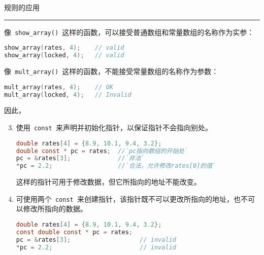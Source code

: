 \begin{frame}[fragile]
规则的应用
\rule{\textwidth}{0.2mm} 
像\lstinline| show_array() |这样的函数，可以接受普通数组和常量数组的名称作为实参：
\begin{lstlisting}[language=c,backgroundcolor=\color{red!20}]
show_array(rates, 4);    // valid
show_array(locked, 4);   // valid
\end{lstlisting} \vspace{0.1in}

像\lstinline| mult_array() |这样的函数，不能接受常量数组的名称作为参数：
\begin{lstlisting}[language=c,backgroundcolor=\color{red!20}]
mult_array(rates, 4);    // OK
mult_array(locked, 4);   // Invalid
\end{lstlisting}
\vspace{0.1in}

因此，
\end{frame}

\begin{frame}[fragile]
\begin{enumerate}\setcounter{enumi}{2}
\item 使用\lstinline| const |来声明并初始化指针，以保证指针不会指向别处。
\begin{lstlisting}[language=c,backgroundcolor=\color{red!20}]
double rates[4] = {8.9, 10.1, 9.4, 3.2};
double const * pc = rates;  //`pc指向数组的开始处`
pc = &rates[3];             //`非法`
*pc = 2.2;                  //`合法，允许修改rates[0]的值`
\end{lstlisting}
这样的指针可用于修改数据，但它所指向的地址不能改变。
\end{enumerate}
\end{frame}


\begin{frame}[fragile]
\begin{enumerate}\setcounter{enumi}{3}
\item 可使用两个\lstinline| const |来创建指针，该指针既不可以更改所指向的地址，也不可以修改所指向的数据。
\begin{lstlisting}[language=c,backgroundcolor=\color{red!20}]
double rates[4] = {8.9, 10.1, 9.4, 3.2};
const double const * pc = rates;   
pc = &rates[3];                   // invalid
*pc = 2.2;                        // invalid
\end{lstlisting}
\end{enumerate}
\end{frame}

